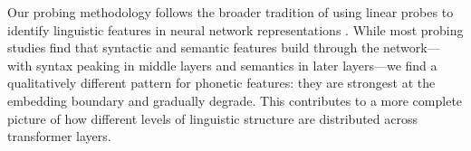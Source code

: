 Our probing methodology follows the broader tradition of using linear probes to identify linguistic features in neural network representations \citep{radford2019language}.
While most probing studies find that syntactic and semantic features build through the network---with syntax peaking in middle layers and semantics in later layers---we find a qualitatively different pattern for phonetic features: they are strongest at the embedding boundary and gradually degrade.
This contributes to a more complete picture of how different levels of linguistic structure are distributed across transformer layers.
